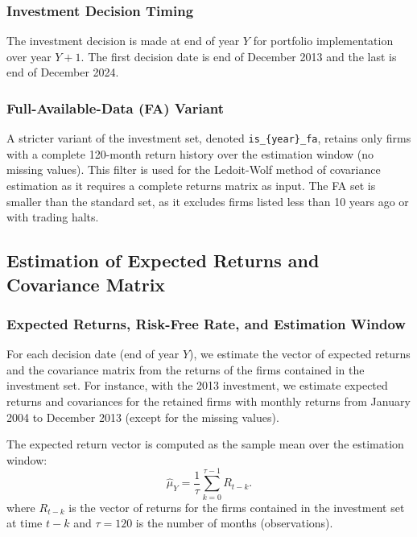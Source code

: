 \documentclass[11pt,a4paper]{article}
\begin{document}
\subsubsection{Investment Decision Timing}

The investment decision is made at end of year \(Y\) for portfolio implementation over year \(Y+1\). The first decision date is end of December 2013 and the last is end of December 2024.

\subsubsection{Full-Available-Data (FA) Variant}

A stricter variant of the investment set, denoted \texttt{is\_\{year\}\_fa}, retains only firms with a complete 120-month return history over the estimation window (no missing values). This filter is used for the Ledoit-Wolf method of covariance estimation as it requires a complete returns matrix as input. The FA set is smaller than the standard set, as it excludes firms listed less than 10 years ago or with trading halts.

\subsection{Estimation of Expected Returns and Covariance Matrix}

\subsubsection{Expected Returns, Risk-Free Rate, and Estimation Window}

For each decision date (end of year \(Y\)), we estimate the vector of expected returns and the covariance matrix from the returns of the firms contained in the investment set. For instance, with the 2013 investment, we estimate expected returns and covariances for the retained firms with monthly returns from January 2004 to December 2013 (except for the missing values). 

The expected return vector is computed as the sample mean over the estimation window:
\begin{equation}
\hat{\mu}_Y = \frac{1}{\tau} \sum_{k=0}^{\tau-1} R_{t-k}.
\end{equation}
where \(R_{t-k}\) is the vector of returns for the firms contained in the investment set at time \(t-k\) and \(\tau = 120\) is the number of months (observations). 
\end{document}
